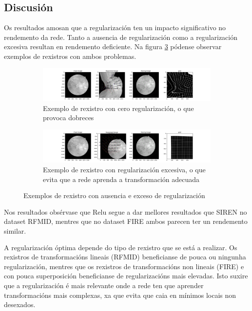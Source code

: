
\subsection{Discusión}
\label{subsec:Discusion-regularization}

Os resultados amosan que a regularización ten un impacto significativo no rendemento da rede. Tanto a ausencia de regularización como a regularización excesiva resultan en rendemento deficiente.
Na figura \ref{fig:regularization_examples} pódense observar exemplos de rexistros con ambos problemas.

\begin{figure}[ht]
    \centering
    \begin{subfigure}[b]{0.45\textwidth}
        \centering
        \includegraphics[width=\textwidth]{imaxes/reg_examples/no_reg_example.png}
        \caption{Exemplo de rexistro con cero regularización, o que provoca dobreces}
        \label{fig:no_reg_example}
    \end{subfigure}\hfill
    \begin{subfigure}[b]{0.45\textwidth}
        \centering
        \includegraphics[width=\textwidth]{imaxes/reg_examples/too_much_reg_example.png}
        \caption{Exemplo de rexistro con regularización excesiva, o que evita que a rede aprenda a transformación adecuada}
        \label{fig:too_much_reg_example}
    \end{subfigure}
    \caption{Exemplos de rexistro con ausencia e exceso de regularización}
    \label{fig:regularization_examples}
\end{figure}

Nos resultados obsérvase que Relu segue a dar mellores resultados que SIREN no dataset RFMID, mentres que no dataset FIRE ambos parecen ter un rendemento similar.

A regularización óptima depende do tipo de rexistro que se está a realizar. Os rexistros de transformacións lineais (RFMID) beneficianse de pouca ou ningunha regularización, mentres que os rexistros de transformacións non lineais (FIRE) e con pouca superposición beneficianse de regularizacións mais elevadas.
Isto suxire que a regularización é mais relevante onde a rede ten que aprender transformacións mais complexas, xa que evita que caia en mínimos locais non desexados.

